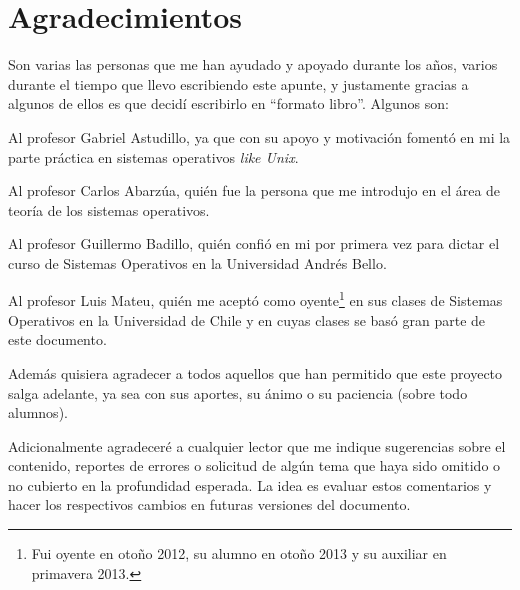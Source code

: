 %
%
%
% 

\chapter*{Agradecimientos}
Son varias las personas que me han ayudado y apoyado durante los años, varios
durante el tiempo que llevo escribiendo este apunte, y justamente gracias a
algunos de ellos es que decidí escribirlo en ``formato libro''. Algunos son:

Al profesor Gabriel Astudillo, ya que con su apoyo y motivación fomentó en mi la
parte práctica en sistemas operativos \textit{like Unix}.

Al profesor Carlos Abarzúa, quién fue la persona que me introdujo en el área de
teoría de los sistemas operativos.

Al profesor Guillermo Badillo, quién confió en mi por primera vez para dictar el
curso de Sistemas Operativos en la Universidad Andrés Bello.

Al profesor Luis Mateu, quién me aceptó como oyente\footnote{Fui oyente en otoño
2012, su alumno en otoño 2013 y su auxiliar en primavera 2013.} en sus clases de
Sistemas Operativos en la Universidad de Chile y en cuyas clases se basó gran
parte de este documento.

Además quisiera agradecer a todos aquellos que han permitido que este proyecto
salga adelante, ya sea con sus aportes, su ánimo o su paciencia (sobre todo
alumnos).

Adicionalmente agradeceré a cualquier lector que me indique sugerencias sobre el
contenido, reportes de errores o solicitud de algún tema que haya sido omitido o
no cubierto en la profundidad esperada. La idea es evaluar estos comentarios y
hacer los respectivos cambios en futuras versiones del documento.

\newpage
\mbox{}
\thispagestyle{empty}
